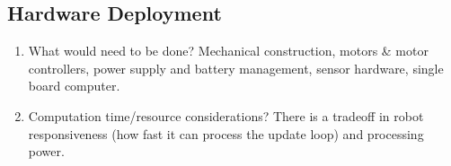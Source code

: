 \documentclass[10pt,journal,compsoc]{IEEEtran}
\begin{document}
\subsection{Hardware Deployment}
\begin{enumerate}
\item What would need to be done?
Mechanical construction, motors \& motor controllers, power supply and battery management, sensor hardware, single board computer.
\item Computation time/resource considerations?
There is a tradeoff in robot responsiveness (how fast it can process the update loop) and processing power.
\end{enumerate}





\end{document}
